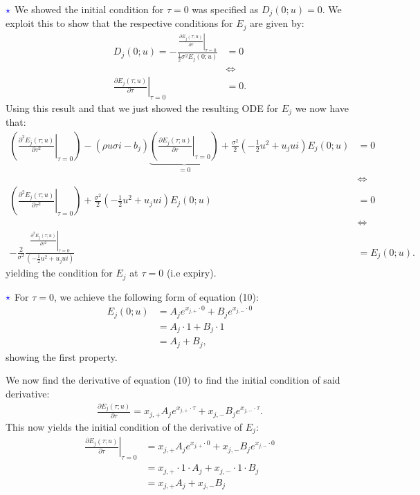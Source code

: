 \documentclass[12pt]{article}
\numberwithin{equation}{section}
\begin{document}
$\textcolor{blue}{\star}$  We showed the initial condition for $\tau=0$ was
specified as
$D_j(0;u)=0$. We exploit this to show that the respective conditions for $E_j$ are
given by:
\begin{align*}
    D_j(0;u)=-\frac{\left. \frac{\partial E_j(\tau;u)}{\partial \tau}\right|_{\tau=0}}{\frac{1}{2}\sigma^2E_j(0;u)}&=0\\
    &\iff\\
    \left. \frac{\partial E_j(\tau;u)}{\partial \tau}\right|_{\tau=0}&=0.
\end{align*}
Using this result and that we just showed the resulting ODE for $E_j$ we now have that:
\begin{align*}
    \left ( \left. \frac{\partial^2 E_j(\tau;u)}{\partial \tau^2}\right|_{\tau=0} \right )-(\rho u \sigma i-b_j)\underbrace{\left (\left. \frac{\partial E_j(\tau;u)}{\partial \tau}\right|_{\tau=0} \right )}_{= 0} + \frac{\sigma^2}{2} \left( -\frac{1}{2}u^2 + u_j ui \right) E_j(0;u)&= 0\\
    &\iff\\
    \left ( \left. \frac{\partial^2 E_j(\tau;u)}{\partial \tau^2}\right|_{\tau=0} \right ) + \frac{\sigma^2}{2} \left( -\frac{1}{2}u^2 + u_j ui \right) E_j(0;u) &= 0\\
    &\iff\\
    -\frac{2}{\sigma^2}\frac{\left.\frac{\partial^2 E_j(\tau;u)}{\partial \tau^2}\right|_{\tau=0}}{\left( -\frac{1}{2}u^2 + u_j ui \right)}&=E_j(0;u).
\end{align*}
yielding the condition for $E_j$ at $\tau=0$ (i.e expiry).

$\textcolor{blue}{\star}$ For $\tau=0$, we achieve the following form of
equation (10):
\begin{align*}
    E_j(0;u)&=A_je^{x_{j,+}\cdot 0}+B_je^{x_{j,-}\cdot 0}\\&
    =A_j\cdot 1+B_j \cdot 1\\
    &=A_j + B_j,
\end{align*}
showing the first property.

We now find the derivative of equation (10) to find the initial condition of
said derivative:
\begin{align*}
    \frac{\partial E_j(\tau;u)}{\partial \tau}=x_{j,+}A_je^{x_{j,+}\cdot\tau}+x_{j,-}B_je^{x_{j,-}\cdot\tau}.
\end{align*}
This now yields the initial condition of the derivative of $E_j$:
\begin{align*}
    \left. \frac{\partial E_j(\tau;u)}{\partial \tau} \right|_{\tau=0}&=x_{j,+}A_je^{x_{j,+}\cdot 0}+x_{j,-}B_j e^{x_{j,-}\cdot 0}\\
    &=x_{j,+} \cdot 1 \cdot A_j+x_{j,-} \cdot 1 \cdot B_j \\
    &=x_{j,+} A_j+x_{j,-} B_j
\end{align*}
\end{document}
